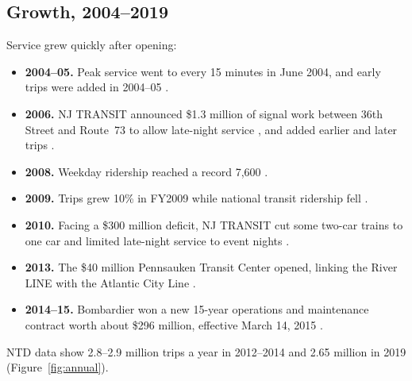 \documentclass[11pt]{article}
\begin{document}
\subsection{Growth, 2004--2019}
Service grew quickly after opening:
\begin{itemize}
\item \textbf{2004--05.} Peak service went to every 15 minutes in June 2004, and early trips were added in 2004--05 \citep{njt2004fifteen,njt2008ridership}.
\item \textbf{2006.} NJ TRANSIT announced \$1.3 million of signal work between 36th Street and Route~73 to allow late-night service \citep{njt2006latenight}, and added earlier and later trips \citep{njt2006earlier}.
\item \textbf{2008.} Weekday ridership reached a record 7{,}600 \citep{njt2008ridership}.
\item \textbf{2009.} Trips grew 10\% in FY2009 while national transit ridership fell \citep{tstc2011}.
\item \textbf{2010.} Facing a \$300 million deficit, NJ TRANSIT cut some two-car trains to one car and limited late-night service to event nights \citep{njt2010fare}.
\item \textbf{2013.} The \$40 million Pennsauken Transit Center opened, linking the River LINE with the Atlantic City Line \citep{inquirer2013pennsauken}.
\item \textbf{2014--15.} Bombardier won a new 15-year operations and maintenance contract worth about \$296 million, effective March 14, 2015 \citep{masstransit2014bombardier}.
\end{itemize}
NTD data show 2.8--2.9 million trips a year in 2012--2014 and 2.65 million in 2019 (Figure~\ref{fig:annual}).
\end{document}
